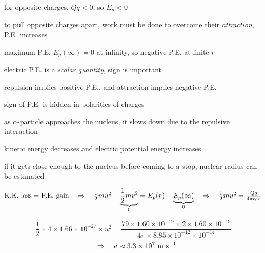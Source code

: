 \cmt for opposite charges, $Qq < 0$, so $E_p < 0$

to pull opposite charges apart, work must be done to overcome their \emph{attraction}, P.E. increases

maximum P.E. $E_p(\infty)=0$ at infinity, so negative P.E. at finite $r$

\cmt electric P.E. is a \emph{scalar quantity}, sign is important

repulsion implies positive P.E., and attraction implies negative P.E.

sign of P.E. is hidden in polarities of charges


	
\begin{soln} as $\alpha$-particle approaches the nucleus, it slows down due to the repulsive interaction

kinetic energy decreases and electric potential energy increases

if it gets close enough to the nucleus before coming to a stop, nuclear radius can be estimated

{

\centering

$\text{K.E. loss} = \text{P.E. gain} \quad \Rightarrow \quad \frac{1}{2}mu^2 - \underbrace{\frac{1}{2}mv^2}_0 = E_p(r) - \underbrace{E_p(\infty)}_0 \quad \Rightarrow \quad  \frac{1}{2}mu^2= \frac{Qq}{4\pi\epsilon_0r}$

}

\begin{equation*}
	\frac{1}{2}\times4\times1.66\times10^{-27}\times u^2 = \frac{79\times1.60\times10^{-19}\times2\times1.60\times10^{-19}}{4\pi\times8.85\times10^{-12}\times10^{-14}} \end{equation*}
 \begin{equation*} 
 \quad \Rightarrow \quad	u\approx 3.3\times10^7\text{ m s$^{-1}$} 
\end{equation*}
\end{soln}




